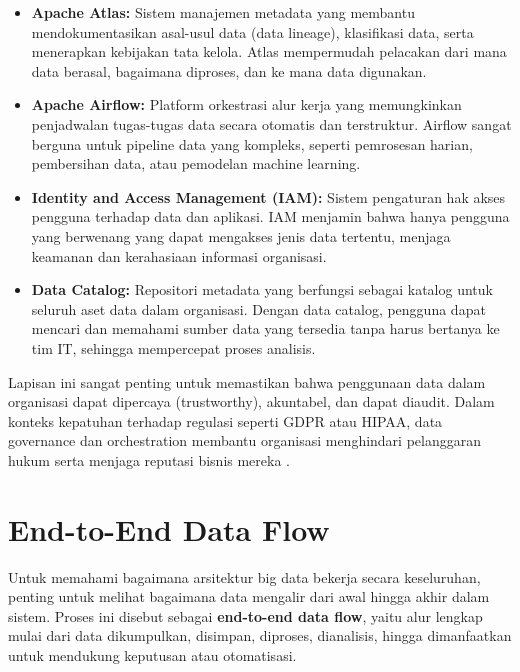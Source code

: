 \begin{itemize}
	\item \textbf{Apache Atlas:} Sistem manajemen metadata yang membantu mendokumentasikan asal-usul data (data lineage), klasifikasi data, serta menerapkan kebijakan tata kelola. Atlas mempermudah pelacakan dari mana data berasal, bagaimana diproses, dan ke mana data digunakan.
	
	\item \textbf{Apache Airflow:} Platform orkestrasi alur kerja yang memungkinkan penjadwalan tugas-tugas data secara otomatis dan terstruktur. Airflow sangat berguna untuk pipeline data yang kompleks, seperti pemrosesan harian, pembersihan data, atau pemodelan machine learning.
	
	\item \textbf{Identity and Access Management (IAM):} Sistem pengaturan hak akses pengguna terhadap data dan aplikasi. IAM menjamin bahwa hanya pengguna yang berwenang yang dapat mengakses jenis data tertentu, menjaga keamanan dan kerahasiaan informasi organisasi.
	
	\item \textbf{Data Catalog:} Repositori metadata yang berfungsi sebagai katalog untuk seluruh aset data dalam organisasi. Dengan data catalog, pengguna dapat mencari dan memahami sumber data yang tersedia tanpa harus bertanya ke tim IT, sehingga mempercepat proses analisis.
\end{itemize}

Lapisan ini sangat penting untuk memastikan bahwa penggunaan data dalam organisasi dapat dipercaya (trustworthy), akuntabel, dan dapat diaudit. Dalam konteks kepatuhan terhadap regulasi seperti GDPR atau HIPAA, data governance dan orchestration membantu organisasi menghindari pelanggaran hukum serta menjaga reputasi bisnis mereka \cite{olson2020practical, otto2011data}.



\section{End-to-End Data Flow}

Untuk memahami bagaimana arsitektur big data bekerja secara keseluruhan, penting untuk melihat bagaimana data mengalir dari awal hingga akhir dalam sistem. Proses ini disebut sebagai \textbf{end-to-end data flow}, yaitu alur lengkap mulai dari data dikumpulkan, disimpan, diproses, dianalisis, hingga dimanfaatkan untuk mendukung keputusan atau otomatisasi.

